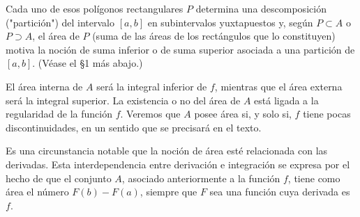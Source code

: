 \documentclass[12pt,oneside]{book}
\begin{document}
\begin{center}
\end{center}

Cada uno de esos polígonos rectangulares \(P\) determina una descomposición ("partición") del intervalo \([a, b]\) en subintervalos yuxtapuestos y, según \(P \subset A\) o \(P \supset A\), el área de \(P\) (suma de las áreas de los rectángulos que lo constituyen) motiva la noción de suma inferior o de suma superior asociada a una partición de \([a, b]\). (Véase el §1 más abajo.)

El área interna de \(A\) será la integral inferior de \(f\), mientras que el área externa será la integral superior. La existencia o no del área de \(A\) está ligada a la regularidad de la función \(f\). Veremos que \(A\) posee área si, y solo si, \(f\) tiene pocas discontinuidades, en un sentido que se precisará en el texto.

Es una circunstancia notable que la noción de área esté relacionada con las derivadas. Esta interdependencia entre derivación e integración se expresa por el hecho de que el conjunto \(A\), asociado anteriormente a la función \(f\), tiene como área el número \(F(b) - F(a)\), siempre que \(F\) sea una función cuya derivada es \(f\).
\end{document}
